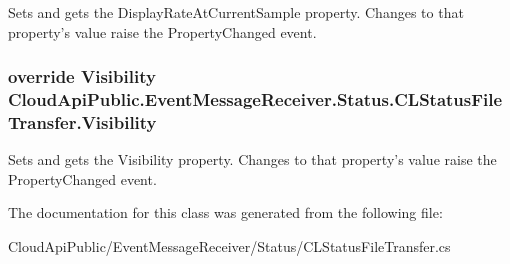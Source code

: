 Sets and gets the Display\-Rate\-At\-Current\-Sample property. Changes to that property's value raise the Property\-Changed event. 

\hypertarget{class_cloud_api_public_1_1_event_message_receiver_1_1_status_1_1_c_l_status_file_transfer_a86c0a97a5c26a27131d350d1089a36f2}{
\subsubsection[{Visibility}]{\setlength{\rightskip}{0pt plus 5cm}override Visibility Cloud\-Api\-Public.\-Event\-Message\-Receiver.\-Status.\-C\-L\-Status\-File\-Transfer.\-Visibility\hspace{0.3cm}{\ttfamily [get]}}}\label{class_cloud_api_public_1_1_event_message_receiver_1_1_status_1_1_c_l_status_file_transfer_a86c0a97a5c26a27131d350d1089a36f2}


Sets and gets the Visibility property. Changes to that property's value raise the Property\-Changed event. 



The documentation for this class was generated from the following file\-:\begin{DoxyCompactItemize}
\item 
Cloud\-Api\-Public/\-Event\-Message\-Receiver/\-Status/C\-L\-Status\-File\-Transfer.\-cs\end{DoxyCompactItemize}
